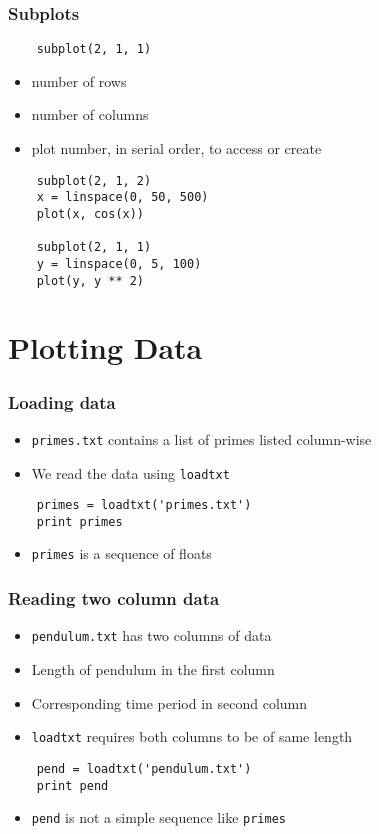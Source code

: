 \begin{frame}[fragile]
  \frametitle{Subplots}
  \begin{lstlisting}
    subplot(2, 1, 1)
  \end{lstlisting}
  \begin{itemize}
  \item number of rows
  \item number of columns
  \item plot number, in serial order, to access or create
  \end{itemize}
  \begin{lstlisting}
    subplot(2, 1, 2)
    x = linspace(0, 50, 500)
    plot(x, cos(x))

    subplot(2, 1, 1)
    y = linspace(0, 5, 100)
    plot(y, y ** 2)
  \end{lstlisting}
\end{frame}

\section{Plotting Data}

\begin{frame}[fragile]
  \frametitle{Loading data}
  \begin{itemize}
  \item \texttt{primes.txt} contains a list of primes listed
    column-wise
  \item We read the data using \texttt{loadtxt} 
  \end{itemize}
  \begin{lstlisting}
    primes = loadtxt('primes.txt')
    print primes
  \end{lstlisting}
  \begin{itemize}
  \item \texttt{primes} is a sequence of floats
  \end{itemize}
\end{frame}

\begin{frame}[fragile]
  \frametitle{Reading two column data}
  \begin{itemize}
  \item \texttt{pendulum.txt} has two columns of data
  \item Length of pendulum in the first column 
  \item Corresponding time period in second column
  \item \texttt{loadtxt} requires both columns to be of same length
  \end{itemize}
  \begin{lstlisting}
    pend = loadtxt('pendulum.txt')
    print pend
  \end{lstlisting}
  \begin{itemize}
  \item \texttt{pend} is not a simple sequence like \texttt{primes}
  \end{itemize}
\end{frame}

